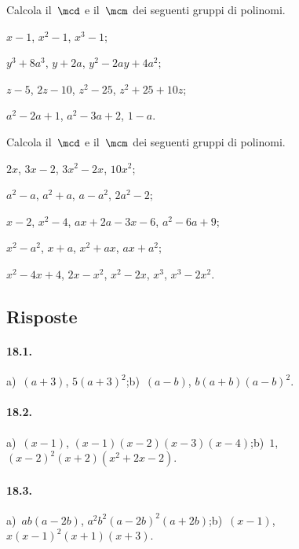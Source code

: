\begin{esercizio}
\label{ese:18.10}
Calcola il~$\mcd$ e il~$\mcm$ dei seguenti gruppi di polinomi.
\begin{multicols}{2}
\begin{enumeratea}
 \item $x-1$, $x^{2}-1$, $x^{3}-1$;
 \item $y^{3}+8a^{3}$, $y+2a$, $y^{2}-2ay+4a^{2}$;
 \item $z-5$, $2z-10$, $z^{2}-25$, $z^{2}+25+10z$;
 \item $a^{2}-2a+1$, $a^{2}-3a+2$, $1-a$.
\end{enumeratea}
\end{multicols}
\end{esercizio}

\begin{esercizio}
\label{ese:18.11}
Calcola il~$\mcd$ e il~$\mcm$ dei seguenti gruppi di polinomi.
\begin{enumeratea}
 \item $2x$, $3x-2$, $3x^{2}-2x$, $10x^{2}$;
 \item $a^{2}-a$, $a^{2}+a$, $a-a^{2}$, $2a^{2}-2$;
 \item $x-2$, $x^{2}-4$, $ax+2a-3x-6$, $a^{2}-6a+9$;
 \item $x^{2}-a^{2}$, $x+a$, $x^{2}+ax$, $ax+a^{2}$;
 \item $x^{2}-4x+4$, $2x-x^{2}$, $x^{2}-2x$, $x^{3}$, $x^{3}-2x^{2}$.
\end{enumeratea}
\end{esercizio}

\subsection{Risposte}

\paragraph{18.1.}
a)~$(a+3)$, $5(a+3)^2$;\quad b)~$(a-b)$, $b(a+b)(a-b)^2$.

\paragraph{18.2.}
a)~$(x-1)$, $(x-1)(x-2)(x-3)(x-4)$;\quad b)~$1$, $(x-2)^2(x+2)\left(x^2+2x-2\right)$.

\paragraph{18.3.}
a)~$ab(a-2b)$, $a^2 b^2(a-2b)^2(a+2b)$;\quad b)~$(x-1)$, $x(x-1)^2(x+1)(x+3)$.

